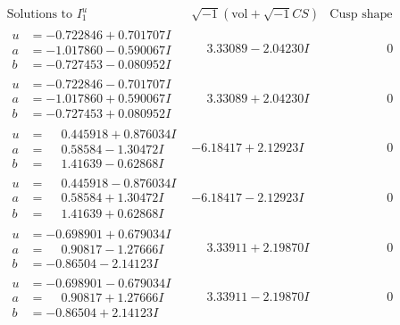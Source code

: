 \documentclass[1p]{elsarticle_modified}
\theoremstyle{definition}
\newcommand{\I}{\sqrt{-1}}
\begin{document}
$$\begin{array}{c|c|c}  
\text{Solutions to }I^u_{1}& \I (\text{vol} + \sqrt{-1}CS) & \text{Cusp shape}\\
 \hline 
\begin{aligned}
u &= -0.722846 + 0.701707 I \\
a &= -1.017860 - 0.590067 I \\
b &= -0.727453 - 0.080952 I\end{aligned}
 & \phantom{-}3.33089 - 2.04230 I & \phantom{-0.000000 } 0 \\ \hline\begin{aligned}
u &= -0.722846 - 0.701707 I \\
a &= -1.017860 + 0.590067 I \\
b &= -0.727453 + 0.080952 I\end{aligned}
 & \phantom{-}3.33089 + 2.04230 I & \phantom{-0.000000 } 0 \\ \hline\begin{aligned}
u &= \phantom{-}0.445918 + 0.876034 I \\
a &= \phantom{-}0.58584 - 1.30472 I \\
b &= \phantom{-}1.41639 - 0.62868 I\end{aligned}
 & -6.18417 + 2.12923 I & \phantom{-0.000000 } 0 \\ \hline\begin{aligned}
u &= \phantom{-}0.445918 - 0.876034 I \\
a &= \phantom{-}0.58584 + 1.30472 I \\
b &= \phantom{-}1.41639 + 0.62868 I\end{aligned}
 & -6.18417 - 2.12923 I & \phantom{-0.000000 } 0 \\ \hline\begin{aligned}
u &= -0.698901 + 0.679034 I \\
a &= \phantom{-}0.90817 - 1.27666 I \\
b &= -0.86504 - 2.14123 I\end{aligned}
 & \phantom{-}3.33911 + 2.19870 I & \phantom{-0.000000 } 0 \\ \hline\begin{aligned}
u &= -0.698901 - 0.679034 I \\
a &= \phantom{-}0.90817 + 1.27666 I \\
b &= -0.86504 + 2.14123 I\end{aligned}
 & \phantom{-}3.33911 - 2.19870 I & \phantom{-0.000000 } 0 \\ \hline\begin{aligned}

\end{aligned}
\end{array}$$
\end{document}
